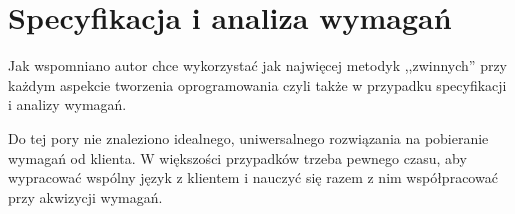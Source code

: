 \chapter{Specyfikacja i analiza wymagań}
\label{cha:specyfikacjaWymagan}

Jak wspomniano  autor chce wykorzystać jak najwięcej metodyk ,,zwinnych'' przy każdym aspekcie tworzenia oprogramowania czyli także w przypadku specyfikacji i analizy wymagań.

Do tej pory nie znaleziono idealnego, uniwersalnego rozwiązania na pobieranie wymagań od klienta. W większości przypadków trzeba pewnego czasu, aby wypracować wspólny język z klientem i nauczyć się razem z nim współpracować przy akwizycji wymagań.



